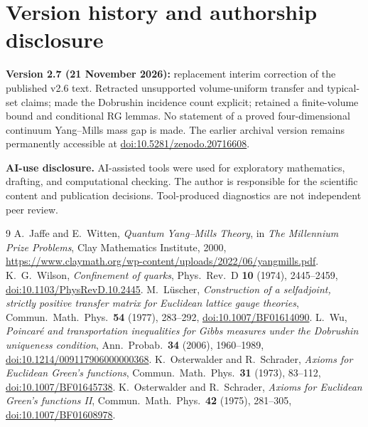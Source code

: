 \documentclass[11pt,a4paper]{article}
\theoremstyle{remark}
\begin{document}
\section*{Version history and authorship disclosure}
\textbf{Version 2.7 (21 November 2026):}
replacement interim correction of the published
v2.6 text. Retracted unsupported
volume-uniform transfer and typical-set
claims; made the Dobrushin incidence count
explicit; retained a finite-volume bound
and conditional RG lemmas. No statement
of a proved four-dimensional continuum
Yang--Mills mass gap is made.
The earlier archival version remains
permanently accessible at
\href{https://doi.org/10.5281/zenodo.20716608}
{doi:10.5281/zenodo.20716608}.
\par\medskip
\textbf{AI-use disclosure.}
AI-assisted tools were used for
exploratory mathematics, drafting,
and computational checking.
The author is responsible for the
scientific content and publication
decisions. Tool-produced diagnostics
are not independent peer review.

\begin{thebibliography}{9}\small
{}
A.~Jaffe and E.~Witten,
\emph{Quantum Yang--Mills Theory},
in \emph{The Millennium Prize Problems},
Clay Mathematics Institute, 2000,
\url{https://www.claymath.org/wp-content/uploads/2022/06/yangmills.pdf}.
K.~G.~Wilson,
\emph{Confinement of quarks},
Phys.\ Rev.\ D \textbf{10} (1974), 2445--2459,
\href{https://doi.org/10.1103/PhysRevD.10.2445}{doi:10.1103/PhysRevD.10.2445}.
M.~L\"uscher,
\emph{Construction of a selfadjoint, strictly positive transfer
matrix for Euclidean lattice gauge theories},
Commun.\ Math.\ Phys.\ \textbf{54} (1977), 283--292,
\href{https://doi.org/10.1007/BF01614090}{doi:10.1007/BF01614090}.
L.~Wu,
\emph{Poincar\'e and transportation inequalities for Gibbs
measures under the Dobrushin uniqueness condition},
Ann.\ Probab.\ \textbf{34} (2006), 1960--1989,
\href{https://doi.org/10.1214/009117906000000368}
{doi:10.1214/009117906000000368}.
K.~Osterwalder and R.~Schrader,
\emph{Axioms for Euclidean Green's functions},
Commun.\ Math.\ Phys.\ \textbf{31} (1973), 83--112,
\href{https://doi.org/10.1007/BF01645738}{doi:10.1007/BF01645738}.
K.~Osterwalder and R.~Schrader,
\emph{Axioms for Euclidean Green's functions II},
Commun.\ Math.\ Phys.\ \textbf{42} (1975), 281--305,
\href{https://doi.org/10.1007/BF01608978}{doi:10.1007/BF01608978}.
\end{thebibliography}
\end{document}
